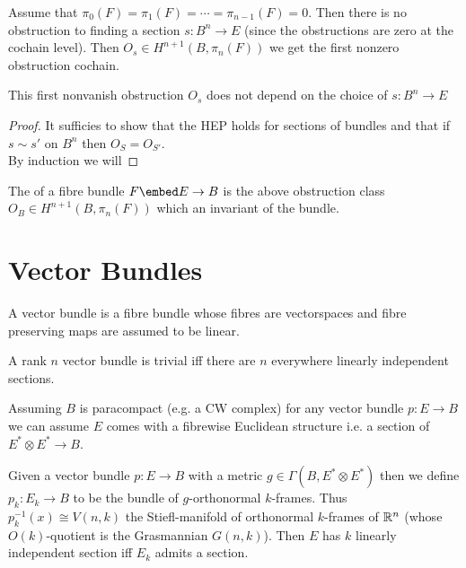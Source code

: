 \documentclass[12pt]{extarticle}
\begin{document}
Assume that $\pi_0(F) = \pi_1(F) = \cdots = \pi_{n-1}(F) = 0$. Then there is no obstruction to finding a section $s : B^n \to E$ (since the obstructions are zero at the cochain level). Then $O_s \in H^{n+1}(B, \pi_n(F))$ we get the first nonzero obstruction cochain.

\begin{prop}
This first nonvanish obstruction $O_s$ does not depend on the choice of $s : B^n \to E$
\end{prop}

\begin{proof}
It sufficies to show that the HEP holds for sections of bundles and that if $s \sim s'$ on $B^n$ then $O_S = O_{S'}$. 
\bigskip\\
By induction we will 
\end{proof}

\begin{definition}
The  of a fibre bundle $F \embed E \to B$ is the above obstruction class $O_B \in H^{n+1}(B, \pi_n(F))$ which an invariant of the bundle. 
\end{definition}

\section{Vector Bundles}

\begin{definition}
A vector bundle is a fibre bundle whose fibres are vectorspaces and fibre preserving maps are assumed to be linear.
\end{definition}

\begin{lemma}
A rank $n$ vector bundle is trivial iff there are $n$ everywhere linearly independent sections.
\end{lemma}

\begin{rmk}
Assuming $B$ is paracompact (e.g. a CW complex) for any vector bundle $p : E \to B$ we can assume $E$ comes with a fibrewise Euclidean structure i.e. a section of $E^* \otimes E^* \to B$. 
\end{rmk}

\begin{defn}
Given a vector bundle $p : E \to B$ with a metric $g \in \Gamma(B, E^* \otimes E^*)$ then we define $p_k : E_k \to B$ to be the bundle of $g$-orthonormal $k$-frames. Thus $p_k^{-1}(x) \cong V(n, k)$ the Stiefl-manifold of orthonormal $k$-frames of $\mathbb{R}^n$ (whose $O(k)$-quotient is the Grasmannian $G(n, k)$). Then $E$ has $k$ linearly independent section iff $E_k$ admits a section. 
\end{defn}
\end{document}

